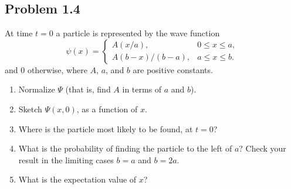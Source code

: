 \documentclass[12pt]{exam}
\begin{document}
\begin{solution}
\begin{enumerate}[(a)]
        \begin{minipage}[t]{0.45\textwidth}
          \centering
        \end{minipage}\hfill
        \begin{minipage}[t]{0.48\textwidth}
          \centering
        \end{minipage}

    \end{enumerate}
\end{solution}




\subsection*{Problem 1.4}
At time $t=0$ a particle is represented by the wave function \[
\psi(x)=
\begin{cases}
  A(x/a),            & 0 \le x \le a,\\
  A(b-x)/(b-a),              & a \le x \le b.
\end{cases}
\] 
and $0$ otherwise, where $A$, $a$, and $b$ are positive constants.
\begin{enumerate}
    \item Normalize $\Psi$ (that is, find $A$ in terms of $a$ and $b$).
    \item Sketch $\Psi(x,0)$, as a function of $x$.
    \item Where is the particle most likely to be found, at $t=0$?
    \item What is the probability of finding the particle to the left of $a$? Check your result in the limiting cases $b=a$ and $b=2a$.
    \item What is the expectation value of $x$?
\end{enumerate}
\end{document}

